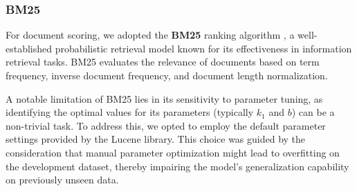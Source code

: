 \subsubsection{BM25}
\label{subsubsec:BM25}
For document scoring, we adopted the \textbf{BM25} ranking algorithm \cite{robertson2009bm25}, a well-established probabilistic retrieval model known for its effectiveness in information retrieval tasks. BM25 evaluates the relevance of documents based on term frequency, inverse document frequency, and document length normalization.

A notable limitation of BM25 lies in its sensitivity to parameter tuning, as identifying the optimal values for its parameters (typically $k_1$ and $b$) can be a non-trivial task. To address this, we opted to employ the default parameter settings provided by the Lucene library. This choice was guided by the consideration that manual parameter optimization might lead to overfitting on the development dataset, thereby impairing the model's generalization capability on previously unseen data.

